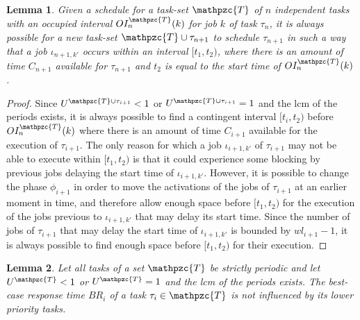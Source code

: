\documentclass[fleqn]{article}
\newtheorem{lemma}{Lemma}
\begin{document}
\begin{lemma}
	Given a schedule for a task-set $\mathpzc{T}$ of $n$ independent tasks with an \textit{occupied interval} $OI^{\mathpzc{T}}_n (k)$ for job $k$ of task $\tau_n$, it is always possible for a new task-set $\mathpzc{T} \cup \tau_{n+1}$ to schedule $\tau_{n+1}$ in such a way that a job $\iota_{n+1, k\prime}$ occurs within an interval $[t_1,t_2)$, where there is an amount of time $C_{n+1}$ available for $\tau_{n+1}$ and $t_2$ is equal to the start time of $OI^{\mathpzc{T}}_n (k)$.
\end{lemma}

\begin{proof}
	Since $U^{\mathpzc{T} \cup \tau_{i+1}}<1$ or $U^{\mathpzc{T} \cup \tau_{i+1}} = 1$ and the lcm of the periods exists, it is always possible to find a contingent interval $[t_i,t_2)$ before $OI^{\mathpzc{T}}_n (k)$ where there is an amount of time $C_{i+1}$ available for the execution of $\tau_{i+1}$. The only reason for which a job $\iota_{i+1, k\prime}$ of $\tau_{i+1}$ may not be able to execute within $[t_1,t_2)$ is that it could experience some blocking by previous jobs delaying the start time of $\iota_{i+1, k\prime}$. However, it is possible to change the phase $\phi_{i+1}$ in order to move the activations of the jobs of $\tau_{i+1}$ at an earlier moment in time, and therefore allow enough space before $[t_1,t_2)$ for the execution of the jobs previous to $\iota_{i+1, k\prime}$ that may delay its start time. Since the number of jobs of $\tau_{i+1}$ that may delay the start time of $\iota_{i+1, k\prime}$ is bounded by $wl_{i+1}-1$, it is always possible to find enough space before $[t_1,t_2)$ for their execution.
\end{proof}

\begin{lemma}
	Let all tasks of a set $\mathpzc{T}$ be strictly periodic and let $U^{\mathpzc{T}}<1$ or $U^{\mathpzc{T}}=1$ and the lcm of the periods exists. The best-case response time $BR_i$ of a task $\tau_i \in \mathpzc{T}$ is not influenced by its lower priority tasks.
\end{lemma}
\end{document}
